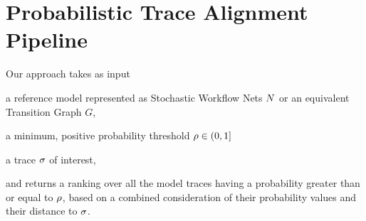 
\section{Probabilistic Trace Alignment Pipeline}
Our approach takes as input
\begin{inparaenum}[\it (i)]
	\item a reference model represented as Stochastic Workflow Nets $N$ or an equivalent Transition Graph $G$,
	\item a minimum, positive probability threshold $\rho \in (0,1]$
	\item a trace $\sigma$ of interest,
\end{inparaenum}
and returns a ranking over all the model traces having a probability greater than or equal to $\rho$, based on a combined consideration of their probability values and their distance to $\sigma$. 

